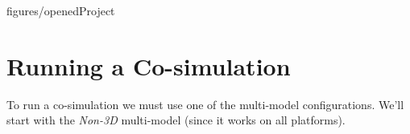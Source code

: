 \documentclass[11pt,a4paper]{../tutorial}
\begin{document}
\begin{instructions}
    \begin{annotation}[height=0.64\linewidth,trim=0 0 250 0,clip]{figures/openedProject}
    \end{annotation}

\end{instructions}

\section{Running a Co-simulation}

To run a co-simulation we must use one of the multi-model configurations. We'll start with the \emph{Non-3D} multi-model (since it works on all platforms).
\end{document}
